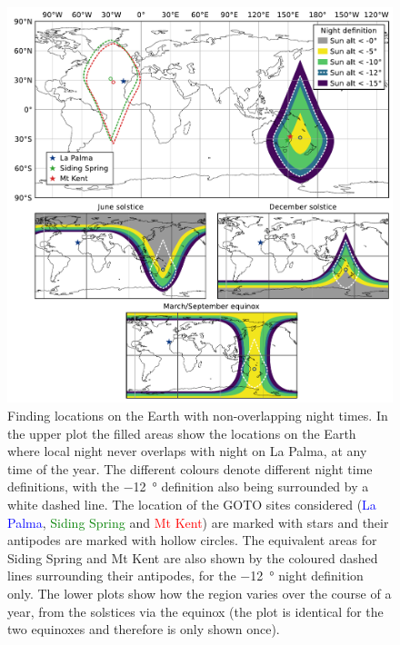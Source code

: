 \begin{colsection}
\begin{colsection}
\begin{figure}[p]
    \begin{center}
        \includegraphics[width=\linewidth]{images/sites.pdf}
    \end{center}
    \caption[Locations on the Earth with non-overlapping night times]{
        Finding locations on the Earth with non-overlapping night times. In the upper plot the filled areas show the locations on the Earth where local night never overlaps with night on La Palma, at any time of the year. The different colours denote different night time definitions, with the \SI{-12}{\degree} definition also being surrounded by a white dashed line. The location of the GOTO sites considered (\textcolor{Blue}{La Palma}, \textcolor{Green}{Siding Spring} and \textcolor{Red}{Mt Kent}) are marked with stars and their antipodes are marked with hollow circles. The equivalent areas for Siding Spring and Mt Kent are also shown by the coloured dashed lines surrounding their antipodes, for the \SI{-12}{\degree} night definition only. The lower plots show how the region varies over the course of a year, from the solstices via the equinox (the plot is identical for the two equinoxes and therefore is only shown once).
    }\label{fig:site_nights}
\end{figure}


\end{colsection}
\end{colsection}

